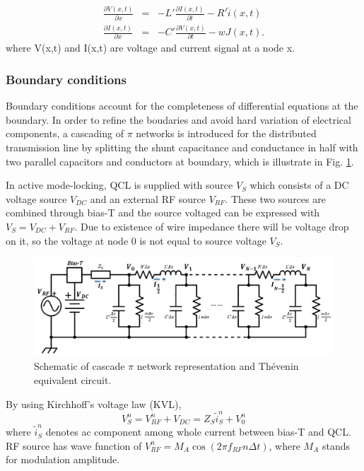 \documentclass[11pt,final]{scrbook}
\begin{document}
\begin{eqnarray}
\frac { \partial V(x,t) }{ \partial x }  &=& -L'\frac { \partial I(x,t) }{ \partial t }-R'\tilde i(x,t) \label{eq:TLequation5}\\
\frac { \partial I(x,t) }{ \partial x }  &=& - C'\frac { \partial V(x,t) }{ \partial t }-wJ(x,t). \label{eq:TLequation6}
\end{eqnarray}
where V(x,t) and I(x,t) are voltage and current signal at a node x. 
\subsubsection{Boundary conditions}
Boundary conditions account for the completeness of differential equations at the boundary. In order to refine the boudaries and avoid hard variation of electrical components, a cascading of $\pi$ networks\cite{orlandi1996fdtd} is introduced for the distributed transmission line by splitting the shunt capacitance and conductance in half with two parallel capacitors and conductors at boundary, which is illustrate in Fig. \ref{fig:BoundaryCondition}. 

In active mode-locking, QCL is supplied with source $ {V}_{S} $ which consists of a DC voltage source $ {V}_{DC} $ and an external RF source $ {V}_{RF} $. These two sources are combined through bias-T and the source voltaged can be expressed with $ {V}_{S}=V_{DC}+{V}_{RF} $. Due to existence of wire impedance there will be voltage drop on it, so the voltage at node 0 is not equal to source voltage $ {V}_{S} $.
\begin{figure}[htbp]
\begin{center}
\includegraphics[scale=0.6]{images/pi_representation.pdf}
\caption{Schematic of cascade $\pi$ network representation and Thévenin equivalent circuit. }
\label{fig:BoundaryCondition}
\end{center}
\end{figure}

By using Kirchhoff's voltage law (KVL), 
\begin{equation}
V_{S}^{n}={ V }_{ RF }^{n}+{V}_{DC} = {Z}_{S}\widetilde{ i }_{ S }^{ n } + {V}_{0}^{n} \label{eq:Vs_n}
\end{equation}
where $\widetilde{ i }_{ S }^{ n }$ denotes ac component among whole current between bias-T and QCL. RF source has wave function of $V_{RF}^{n}=M_{A}\cos(2\pi f_{RF}n\Delta t)$, where $M_{A}$ stands for modulation amplitude. 
\end{document}

